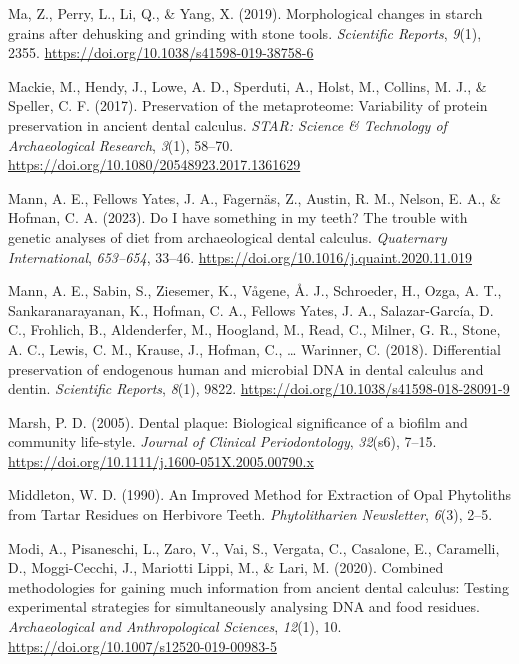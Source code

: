 \documentclass[
  b5paper,
]{book}
\newlength{\cslhangindent}
\newlength{\cslentryspacingunit} %
\newenvironment{CSLReferences}[2] %
 {%
  \setlength{\parindent}{0pt}
  \ifodd #1
  \let\oldpar\par
  \def\par{\hangindent=\cslhangindent\oldpar}
  \fi
  \setlength{\parskip}{#2\cslentryspacingunit}
 }%
 {}
\begin{document}
\begin{CSLReferences}{1}{0}
\leavevmode{}%
Ma, Z., Perry, L., Li, Q., \& Yang, X. (2019). Morphological changes in
starch grains after dehusking and grinding with stone tools.
\emph{Scientific Reports}, \emph{9}(1), 2355.
\url{https://doi.org/10.1038/s41598-019-38758-6}

\leavevmode{}%
Mackie, M., Hendy, J., Lowe, A. D., Sperduti, A., Holst, M., Collins, M.
J., \& Speller, C. F. (2017). Preservation of the metaproteome:
Variability of protein preservation in ancient dental calculus.
\emph{STAR: Science \& Technology of Archaeological Research},
\emph{3}(1), 58--70. \url{https://doi.org/10.1080/20548923.2017.1361629}

\leavevmode{}%
Mann, A. E., Fellows Yates, J. A., Fagernäs, Z., Austin, R. M., Nelson,
E. A., \& Hofman, C. A. (2023). Do {I} have something in my teeth? {The}
trouble with genetic analyses of diet from archaeological dental
calculus. \emph{Quaternary International}, \emph{653--654}, 33--46.
\url{https://doi.org/10.1016/j.quaint.2020.11.019}

\leavevmode{}%
Mann, A. E., Sabin, S., Ziesemer, K., Vågene, Å. J., Schroeder, H.,
Ozga, A. T., Sankaranarayanan, K., Hofman, C. A., Fellows Yates, J. A.,
Salazar-García, D. C., Frohlich, B., Aldenderfer, M., Hoogland, M.,
Read, C., Milner, G. R., Stone, A. C., Lewis, C. M., Krause, J., Hofman,
C., \ldots{} Warinner, C. (2018). Differential preservation of
endogenous human and microbial {DNA} in dental calculus and dentin.
\emph{Scientific Reports}, \emph{8}(1), 9822.
\url{https://doi.org/10.1038/s41598-018-28091-9}

\leavevmode{}%
Marsh, P. D. (2005). Dental plaque: Biological significance of a biofilm
and community life-style. \emph{Journal of Clinical Periodontology},
\emph{32}(s6), 7--15.
\url{https://doi.org/10.1111/j.1600-051X.2005.00790.x}

\leavevmode{}%
Middleton, W. D. (1990). An {Improved Method} for {Extraction} of {Opal
Phytoliths} from {Tartar Residues} on {Herbivore Teeth}.
\emph{Phytolitharien Newsletter}, \emph{6}(3), 2--5.

\leavevmode{}%
Modi, A., Pisaneschi, L., Zaro, V., Vai, S., Vergata, C., Casalone, E.,
Caramelli, D., Moggi-Cecchi, J., Mariotti Lippi, M., \& Lari, M. (2020).
Combined methodologies for gaining much information from ancient dental
calculus: Testing experimental strategies for simultaneously analysing
{DNA} and food residues. \emph{Archaeological and Anthropological
Sciences}, \emph{12}(1), 10.
\url{https://doi.org/10.1007/s12520-019-00983-5}


\end{CSLReferences}
\end{document}
